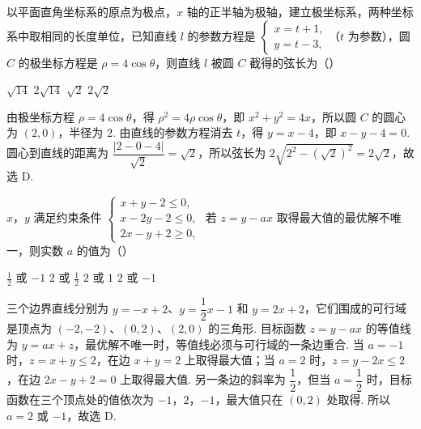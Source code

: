 \begin{problem}
以平面直角坐标系的原点为极点，\(x\) 轴的正半轴为极轴，建立极坐标系，两种坐标系中取相同的长度单位，已知直线 \(l\) 的参数方程是 \(\begin{cases}
x = t + 1,\\
y = t - 3,
\end{cases}\)（\(t\) 为参数），圆 \(C\) 的极坐标方程是 \(\rho = 4\cos \theta\)，则直线 \(l\) 被圆 \(C\) 截得的弦长为（\quad）

\choices
    {\(\sqrt{14}\)}
    {\(2 \sqrt{14}\)}
    {\(\sqrt{2}\)}
    {\(2\sqrt{2}\)}

\begin{solution}
由极坐标方程 \(\rho=4\cos\theta\)，得 \(\rho^{2}=4\rho\cos\theta\)，即 \(x^{2}+y^{2}=4x\)，所以圆 \(C\) 的圆心为 \((2,0)\)，半径为 \(2\). 由直线的参数方程消去 \(t\)，得 \(y=x-4\)，即 \(x-y-4=0\). 圆心到直线的距离为 \(\dfrac{|2-0-4|}{\sqrt{2}}=\sqrt{2}\)，所以弦长为 \(2\sqrt{2^{2}-(\sqrt{2})^{2}}=2\sqrt{2}\)，故选 D.
\end{solution}
\end{problem}

\begin{problem}
\(x\)，\(y\) 满足约束条件 \(\begin{cases}
x + y - 2 \leqslant 0,\\
x - 2y - 2 \leqslant 0,\\
2x - y + 2 \geqslant 0,
\end{cases}\) 若 \(z = y - ax\) 取得最大值的最优解不唯一，则实数 \(a\) 的值为（\quad）

\choices
    {\(\frac{1}{2}\) 或 \(-1\)}
    {\(2\) 或 \(\frac{1}{2}\)}
    {\(2\) 或 \(1\)}
    {\(2\) 或 \(-1\)}

\begin{solution}
三个边界直线分别为 \(y=-x+2\)、\(y=\dfrac12x-1\) 和 \(y=2x+2\)，它们围成的可行域是顶点为 \((-2,-2)\)、\((0,2)\)、\((2,0)\) 的三角形. 目标函数 \(z=y-ax\) 的等值线为 \(y=ax+z\)，最优解不唯一时，等值线必须与可行域的一条边重合.
当 \(a=-1\) 时，\(z=x+y\leqslant2\)，在边 \(x+y=2\) 上取得最大值；当 \(a=2\) 时，\(z=y-2x\leqslant2\)，在边 \(2x-y+2=0\) 上取得最大值. 另一条边的斜率为 \(\dfrac12\)，但当 \(a=\dfrac12\) 时，目标函数在三个顶点处的值依次为 \(-1\)，\(2\)，\(-1\)，最大值只在 \((0,2)\) 处取得. 所以 \(a=2\) 或 \(-1\)，故选 D.
\end{solution}
\end{problem}

